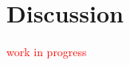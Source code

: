 \section{Discussion} \label{S:discussion}

\textcolor{red}{work in progress}

\begin{comment}
talk about decision statements or thinking-at-loud tasks. the listener provide a decision statement on why the selected stimulus sounded more intelligible

We relied on the DAG presented in section \ref{sS:causal_frame} only to define the analyses described \ref{sS:stat_analysis}. A better planning could be done by designing the experimental design according to our hypothesis described by the causal framework. but ....
\end{comment}

\begin{comment}
Previous research already used hierarchical models with the replicated entropy measures as outcomes \citep{Boonen_et_al_2021, Faes_et_al_2021}. Hierarchical models are powerful to control for heterogeneity in the data, and also to avoid pre-aggregating procedures that could be pernicious for a proper statistical inference \citep{McElreath_2020}. 

These claims are easier to understand using a though experiment within our research. Consider we have two children with the same mean entropy, but the second child shows more variability across the $10$ utterances than the first. It is clear that the average entropy measure informs about the child's average SI, indicating that both children have similar level. However, the entropy's heterogeneity across the $10$ utterances also informs about the child's SI, as a higher variability imply transcribers agreed less about the second child's intelligibility.

The intuition derived from the previous though experiment is similar to the one presented in \citet{Boonen_et_al_2021}, and it is what justify our use of a hierarchical model.
\end{comment}